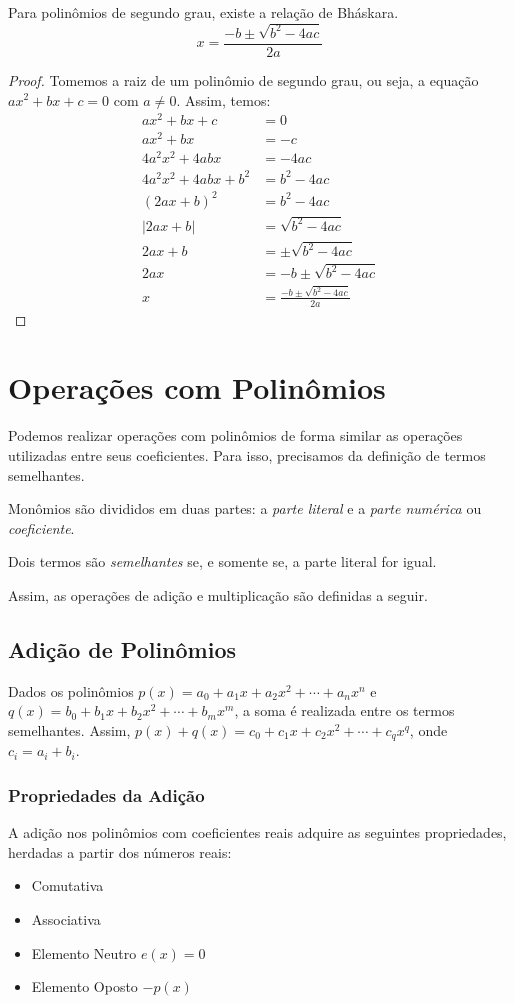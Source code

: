 Para polinômios de segundo grau, existe a relação de Bháskara.
\[x=\frac{-b\pm \sqrt{b^2-4ac}}{2a}\]
\begin{proof}
Tomemos a raiz de um polinômio de segundo grau, ou seja, a equação $ax^2+bx+c=0$ com $a \neq 0$. Assim, temos:
\begin{align*}
ax^2+bx+c&=0 \\
ax^2+bx&=-c \\
4a^2x^2+4abx&=-4ac \\
4a^2x^2+4abx+b^2&=b^2-4ac \\
(2ax+b)^2&=b^2-4ac \\
|2ax+b|&=\sqrt{b^2-4ac} \\
2ax+b&=\pm \sqrt{b^2-4ac} \\
2ax&=-b \pm \sqrt{b^2-4ac} \\
x&= \frac{-b \pm \sqrt{b^2-4ac}}{2a}
\end{align*}
\end{proof}
\section{Operações com Polinômios}
Podemos realizar operações com polinômios de forma similar as operações utilizadas entre seus coeficientes. Para isso, precisamos da definição de termos semelhantes.
\begin{df}
Monômios são divididos em duas partes: a \emph{parte literal} e a \emph{parte numérica} ou \emph{coeficiente}.
\end{df}
\begin{df}
Dois termos são \emph{semelhantes} se, e somente se, a parte literal for igual.
\end{df}
Assim, as operações de adição e multiplicação são definidas a seguir.
\subsection{Adição de Polinômios}
Dados os polinômios $p(x)=a_0+a_1x+a_2x^2+\cdots+a_nx^n$ e $q(x)=b_0+b_1x+b_2x^2+\cdots+b_mx^m$, a soma é realizada entre os termos semelhantes. Assim, $p(x)+q(x)=c_0+c_1x+c_2x^2+\cdots+c_qx^q$, onde $c_i=a_i+b_i$.
\subsubsection{Propriedades da Adição}
A adição nos polinômios com coeficientes reais adquire as seguintes propriedades, herdadas a partir dos números reais:
\begin{itemize}
\item Comutativa
\item Associativa
\item Elemento Neutro $e(x)=0$
\item Elemento Oposto $-p(x)$
\end{itemize}

